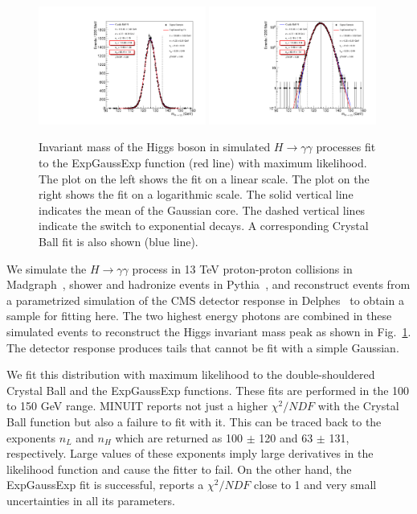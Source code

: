 \documentclass[10pt,letterpaper]{article}
\begin{document}
\begin{figure}[H]
\centering
\includegraphics[width=0.49\textwidth]{c.pdf}
\includegraphics[width=0.49\textwidth]{c_log.pdf}
\caption{Invariant mass of the Higgs boson in simulated $H\to\gamma\gamma$ processes fit to the ExpGaussExp function (red line) with maximum likelihood. The plot on the left shows the fit on a linear scale. The plot on the right shows the fit on a logarithmic scale. The solid vertical line indicates the mean of the Gaussian core. The dashed vertical lines indicate the switch to exponential decays. A corresponding Crystal Ball fit is also shown (blue line).}
\label{fig:HGGFit}
\end{figure}

We simulate the $H\to\gamma\gamma$ process in 13 TeV proton-proton collisions in Madgraph~\cite{Alwall:2011uj}, shower and hadronize events in Pythia~\cite{PYTHIA}, and reconstruct events from a parametrized simulation of the CMS detector response in Delphes~\cite{deFavereau:2013fsa} to obtain a sample for fitting here. The two highest energy photons are combined in these simulated events to reconstruct the Higgs invariant mass peak as shown in Fig.~\ref{fig:HGGFit}. The detector response produces tails that cannot be fit with a simple Gaussian.

We fit this distribution with maximum likelihood to the double-shouldered Crystal Ball and the ExpGaussExp functions. These fits are performed in the 100 to 150 GeV range. MINUIT reports not just a higher $\chi^2/NDF$ with the Crystal Ball function but also a failure to fit with it. This can be traced back to the exponents $n_L$ and $n_H$ which are returned as 100 $\pm$ 120 and 63 $\pm$ 131, respectively. Large values of these exponents imply large derivatives in the likelihood function and cause the fitter to fail. On the other hand, the ExpGaussExp fit is successful, reports a $\chi^2/NDF$ close to 1 and very small uncertainties in all its parameters.
\end{document}

